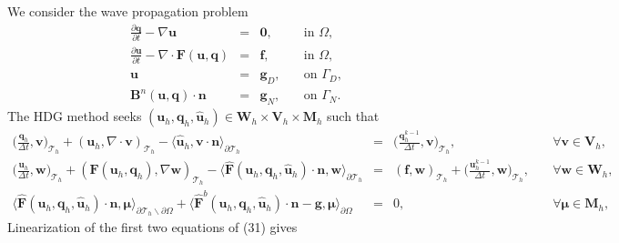 \documentclass[11pt]{article}
\begin{document}
We consider the wave propagation problem
\begin{equation}
\begin{array}{rcll}
\displaystyle \frac{\partial \bm{q}}{\partial t} - \nabla \bm{u}  & = & \bm{0} , & \quad \mbox{in } \Omega, \\
\displaystyle \frac{\partial \bm{u}}{\partial t}  - \nabla \cdot \bm{F} (\bm{u},\bm{q}) & = & \bm{f}, & \quad \mbox{in } \Omega, \\
\bm{u} & = & \bm{g}_D, & \quad \mbox{on } \Gamma_D , \\
\bm{B}^n(\bm{u},\bm{q}) \cdot \bm{n} & = & \bm{g}_N, & \quad \mbox{on } \Gamma_N .
\end{array}
\end{equation}
The HDG method seeks $(\bm{u}_h,\bm{q}_h,\widehat{\bm{u}}_h) \in \bm{W}_h \times \bm{V}_h \times \bm{M}_h$ such that
\begin{equation}
\begin{array}{rcll}
\displaystyle \Big(\frac{\bm{q}_h}{\Delta t}, \bm{v} \Big)_{\mathcal{T}_h} + (\bm{u}_h, \nabla \cdot \bm{v})_{\mathcal{T}_h} - \langle \widehat{\bm{u}}_h, \bm{v} \cdot \bm{n} \rangle_{\partial \mathcal{T}_h}  & = & \displaystyle \Big(\frac{\bm{q}_h^{k-1}}{\Delta t}, \bm{v} \Big)_{\mathcal{T}_h}, & \quad \forall \bm{v} \in \bm{V}_h, \\[2ex] 
\displaystyle \Big(\frac{\bm{u}_h}{\Delta t}, \bm{w} \Big)_{\mathcal{T}_h} + (\bm{F} (\bm{u}_h,\bm{q}_h), \nabla \bm{w})_{\mathcal{T}_h} - \langle \widehat{\bm{F}} (\bm{u}_h, \bm{q}_h,\widehat{\bm{u}}_h) \cdot \bm{n}, \bm{w} \rangle_{\partial \mathcal{T}_h} & = & (\bm{f}, \bm{w})_{\mathcal{T}_h} + \displaystyle \Big(\frac{\bm{u}_h^{k-1}}{\Delta t}, \bm{w} \Big)_{\mathcal{T}_h}, & \quad \forall \bm{w} \in \bm{W}_h, \\[2ex]
\langle \widehat{\bm{F}} (\bm{u}_h,\bm{q}_h, \widehat{\bm{u}}_h) \cdot \bm{n}, \bm{\mu} \rangle_{\partial \mathcal{T}_h \backslash \partial \Omega} + \langle \widehat{\bm{F}}^b(\bm{u}_h, \bm{q}_h, \widehat{\bm{u}}_h) \cdot \bm{n} - \bm{g}, \bm{\mu} \rangle_{\partial \Omega}  & = & 0, & \quad \forall \bm{\mu} \in \bm{M}_h ,
\end{array}
\end{equation}
Linearization of the first two equations of (31) gives
\end{document}
